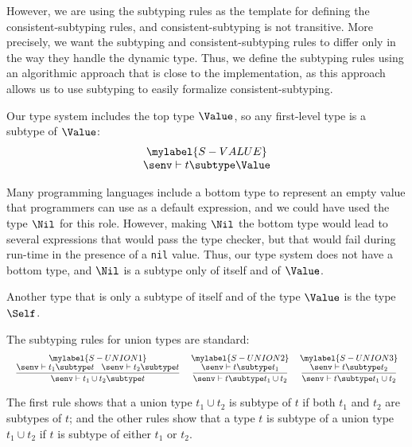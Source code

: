 However, we are using the subtyping rules as the template for defining
the consistent-subtyping rules, and consistent-subtyping is not
transitive.
More precisely, we want the subtyping and consistent-subtyping rules
to differ only in the way they handle the dynamic type.
Thus, we define the subtyping rules using an algorithmic approach
that is close to the implementation, as this approach allows us to use
subtyping to easily formalize consistent-subtyping.

Our type system includes the top type $\Value$,
so any first-level type is a subtype of $\Value$:
\[
\begin{array}{c}
\mylabel{S-VALUE}\\
\senv \vdash t \subtype \Value
\end{array}
\]

Many programming languages include a bottom type to represent
an empty value that programmers can use as a default expression,
and we could have used the type $\Nil$ for this role.
However, making $\Nil$ the bottom type would lead to several expressions
that would pass the type checker, but that would fail during run-time
in the presence of a \texttt{nil} value.
Thus, our type system does not have a bottom type, and $\Nil$ is a
subtype only of itself and of $\Value$.

Another type that is only a subtype of itself and of the type $\Value$
is the type $\Self$.

The subtyping rules for union types are standard:
\[
\begin{array}{c}
\begin{array}{c}
\mylabel{S-UNION1}\\
\dfrac{\senv \vdash t_{1} \subtype t \;\;\;
       \senv \vdash t_{2} \subtype t}
      {\senv \vdash t_{1} \cup t_{2} \subtype t}
\end{array}
\;
\begin{array}{c}
\mylabel{S-UNION2}\\
\dfrac{\senv \vdash t \subtype t_{1}}
      {\senv \vdash t \subtype t_{1} \cup t_{2}}
\end{array}
\;
\begin{array}{c}
\mylabel{S-UNION3}\\
\dfrac{\senv \vdash t \subtype t_{2}}
      {\senv \vdash t \subtype t_{1} \cup t_{2}}
\end{array}
\end{array}
\]

The first rule shows that a union type $t_{1} \cup t_{2}$
is subtype of $t$ if both $t_{1}$ and $t_{2}$ are subtypes
of $t$;
and the other rules show that a type $t$ is subtype
of a union type $t_{1} \cup t_{2}$ if $t$ is subtype of
either $t_{1}$ or $t_{2}$.

